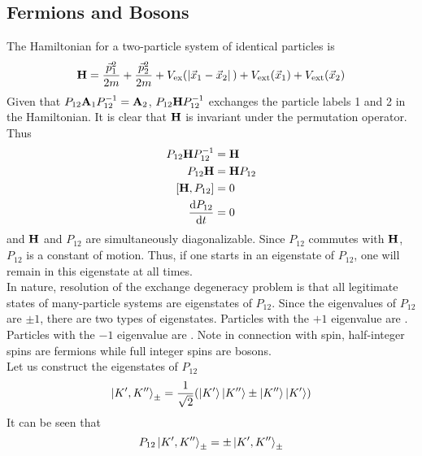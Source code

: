 \documentclass[12pt,a4paper,titlepage]{article}
\newcommand{\trm}[1]{\textrm{#1}} %
\newcommand{\ul}[1]{\underline{\smash{#1}}} %
\begin{document}
\subsection{Fermions and Bosons}
The Hamiltonian for a two-particle system of identical particles is
\begin{equation}
\vb{H}=\frac{\vec{p}_{1}^{2}}{2m}+\frac{\vec{p}_{2}^{2}}{2m}+V_{\trm{ex}}(\abs*{\vec{x}_{1}-\vec{x}_{2}})+V_{\trm{ext}}(\vec{x}_{1})+V_{\trm{ext}}(\vec{x}_{2})
\end{equation}
Given that $P_{12}\vb{A}_{1}P_{12}^{-1}=\vb{A}_{2}$, $P_{12}\vb{H}P_{12}^{-1}$ exchanges the particle labels 1 and 2 in the Hamiltonian. It is clear that $\vb{H}$ is invariant under the permutation operator. Thus
\begin{equation}
\begin{aligned}
P_{12}\vb{H}P_{12}^{-1}&=\vb{H}\\
P_{12}\vb{H}&=\vb{H}P_{12}\\
\comm{\vb{H}}{P_{12}}&=0\\
\dv{P_{12}}{t}&=0
\end{aligned}
\end{equation}
and $\vb{H}$ and $P_{12}$ are simultaneously diagonalizable. Since $P_{12}$ commutes with $\vb{H}$, $P_{12}$ is a constant of motion. Thus, if one starts in an eigenstate of $P_{12}$, one will remain in this eigenstate at all times.\\

In nature, resolution of the exchange degeneracy problem is that all legitimate states of many-particle systems are eigenstates of $P_{12}$. Since the eigenvalues of $P_{12}$ are $\pm1$, there are two types of eigenstates. Particles with the $+1$ eigenvalue are \ul{bosons}. Particles with the $-1$ eigenvalue are \ul{fermions}. Note in connection with spin, half-integer spins are fermions while full integer spins are bosons.\\

Let us construct the eigenstates of $P_{12}$
\begin{equation}
\ket{K^{\prime},K^{\prime\prime}}_{\pm}=\frac{1}{\sqrt{2}}\qty(\ket{K^{\prime}}\ket{K^{\prime\prime}}\pm\ket{K^{\prime\prime}}\ket{K^{\prime}})
\end{equation}
It can be seen that
\begin{equation}
P_{12}\ket{K^{\prime},K^{\prime\prime}}_{\pm}=\pm\ket{K^{\prime},K^{\prime\prime}}_{\pm}
\end{equation}
\end{document}
